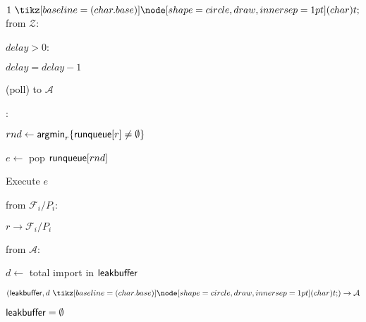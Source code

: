 \begin{bbox}[title={\textbf{Wrapper} $\mathcal{W}_{\msf{sync}}$}]
\OnInput {} $1 \token$ from $\mathcal{Z}$:
	\begin{ritemize}
	\item \If $delay > 0$:
		\begin{renumerate}
		\item $delay = delay - 1$
		\item\Send (poll) to $\mathcal{A}$
		\end{renumerate}
	\item \Else: 
		\begin{renumerate}
		\item $rnd \leftarrow {\mathsf {argmin}}_{r}\{ {\mathsf {runqueue}}[r] \neq \emptyset \}$
		\item $e \leftarrow$ pop ${\mathsf {runqueue}}[rnd]$
		\item Execute $e$
		\end{renumerate}
	\end{ritemize}
\OnInput {} from $\mathcal{F}_i/P_i$:
	\begin{renumerate}
	\item \Send $r \rightarrow \mathcal{F}_i/P_i$
	\end{renumerate}
\OnInput {} from $\mathcal{A}$:
	\begin{renumerate}
	\item $d \leftarrow$ total import in ${\mathsf {leakbuffer}}$
	\item \Send $(\msf{leakbuffer}, d \token) \rightarrow \mathcal{A}$
	\item ${\mathsf {leakbuffer}} = \emptyset$
	\end{renumerate}

\end{bbox}
